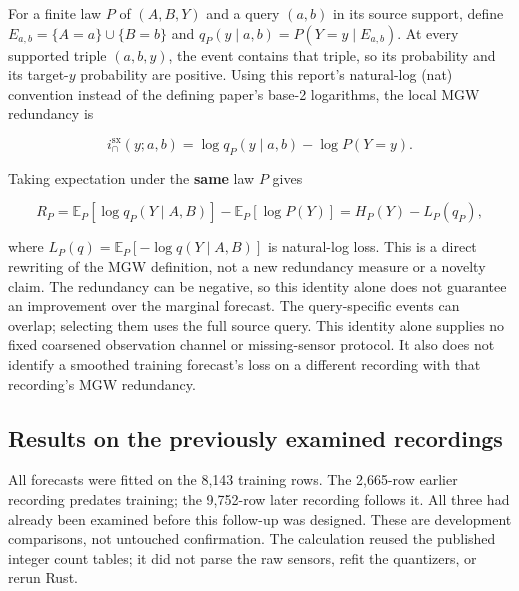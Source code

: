 For a finite law \(P\) of \((A,B,Y)\) and a query \((a,b)\) in its source support, define \(E_{a,b}=\{A=a\}\cup\{B=b\}\) and \(q_P(y\mid a,b)=P(Y=y\mid E_{a,b})\). At every supported triple \((a,b,y)\), the event contains that triple, so its probability and its target-\(y\) probability are positive. Using this report's natural-log (nat) convention instead of the defining paper's base-2 logarithms, the local MGW redundancy is

\[
i^{\mathrm{sx}}_\cap(y;a,b)=\log q_P(y\mid a,b)-\log P(Y=y).
\]

Taking expectation under the \textbf{same} law \(P\) gives

\[
R_P=\mathbb E_P[\log q_P(Y\mid A,B)]
      -\mathbb E_P[\log P(Y)]
    =H_P(Y)-L_P(q_P),
\]

where \(L_P(q)=\mathbb E_P[-\log q(Y\mid A,B)]\) is natural-log loss. This is a direct rewriting of the MGW definition, not a new redundancy measure or a novelty claim. The redundancy can be negative, so this identity alone does not guarantee an improvement over the marginal forecast. The query-specific events can overlap; selecting them uses the full source query. This identity alone supplies no fixed coarsened observation channel or missing-sensor protocol. It also does not identify a smoothed training forecast's loss on a different recording with that recording's MGW redundancy.

\par{}

\subsection{Results on the previously examined recordings}\label{results-on-the-previously-examined-recordings}

All forecasts were fitted on the 8,143 training rows. The 2,665-row earlier recording predates training; the 9,752-row later recording follows it. All three had already been examined before this follow-up was designed. These are development comparisons, not untouched confirmation. The calculation reused the published integer count tables; it did not parse the raw sensors, refit the quantizers, or rerun Rust.

